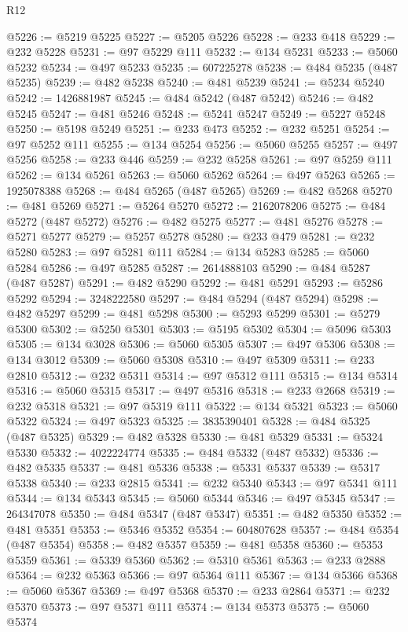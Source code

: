 \begin{lexlean}{R12}
\begin{coremodule}
{{{{{{{{{{{{{{{{{{{{{{{{{{{{{{{{{{{{{{{{{{{{{{{{{{{{{{{{{{{{{{{{{{{{{{{{{{{{{{{{{{@5226 := @5219 @5225
@5227 := @5205 @5226
@5228 := @233 @418
@5229 := @232 @5228
@5231 := @97 @5229 @111
@5232 := @134 @5231
@5233 := @5060 @5232
@5234 := @497 @5233
@5235 := 607225278
@5238 := @484 @5235 (@487 @5235)
@5239 := @482 @5238
@5240 := @481 @5239
@5241 := @5234 @5240
@5242 := 1426881987
@5245 := @484 @5242 (@487 @5242)
@5246 := @482 @5245
@5247 := @481 @5246
@5248 := @5241 @5247
@5249 := @5227 @5248
@5250 := @5198 @5249
@5251 := @233 @473
@5252 := @232 @5251
@5254 := @97 @5252 @111
@5255 := @134 @5254
@5256 := @5060 @5255
@5257 := @497 @5256
@5258 := @233 @446
@5259 := @232 @5258
@5261 := @97 @5259 @111
@5262 := @134 @5261
@5263 := @5060 @5262
@5264 := @497 @5263
@5265 := 1925078388
@5268 := @484 @5265 (@487 @5265)
@5269 := @482 @5268
@5270 := @481 @5269
@5271 := @5264 @5270
@5272 := 2162078206
@5275 := @484 @5272 (@487 @5272)
@5276 := @482 @5275
@5277 := @481 @5276
@5278 := @5271 @5277
@5279 := @5257 @5278
@5280 := @233 @479
@5281 := @232 @5280
@5283 := @97 @5281 @111
@5284 := @134 @5283
@5285 := @5060 @5284
@5286 := @497 @5285
@5287 := 2614888103
@5290 := @484 @5287 (@487 @5287)
@5291 := @482 @5290
@5292 := @481 @5291
@5293 := @5286 @5292
@5294 := 3248222580
@5297 := @484 @5294 (@487 @5294)
@5298 := @482 @5297
@5299 := @481 @5298
@5300 := @5293 @5299
@5301 := @5279 @5300
@5302 := @5250 @5301
@5303 := @5195 @5302
@5304 := @5096 @5303
@5305 := @134 @3028
@5306 := @5060 @5305
@5307 := @497 @5306
@5308 := @134 @3012
@5309 := @5060 @5308
@5310 := @497 @5309
@5311 := @233 @2810
@5312 := @232 @5311
@5314 := @97 @5312 @111
@5315 := @134 @5314
@5316 := @5060 @5315
@5317 := @497 @5316
@5318 := @233 @2668
@5319 := @232 @5318
@5321 := @97 @5319 @111
@5322 := @134 @5321
@5323 := @5060 @5322
@5324 := @497 @5323
@5325 := 3835390401
@5328 := @484 @5325 (@487 @5325)
@5329 := @482 @5328
@5330 := @481 @5329
@5331 := @5324 @5330
@5332 := 4022224774
@5335 := @484 @5332 (@487 @5332)
@5336 := @482 @5335
@5337 := @481 @5336
@5338 := @5331 @5337
@5339 := @5317 @5338
@5340 := @233 @2815
@5341 := @232 @5340
@5343 := @97 @5341 @111
@5344 := @134 @5343
@5345 := @5060 @5344
@5346 := @497 @5345
@5347 := 264347078
@5350 := @484 @5347 (@487 @5347)
@5351 := @482 @5350
@5352 := @481 @5351
@5353 := @5346 @5352
@5354 := 604807628
@5357 := @484 @5354 (@487 @5354)
@5358 := @482 @5357
@5359 := @481 @5358
@5360 := @5353 @5359
@5361 := @5339 @5360
@5362 := @5310 @5361
@5363 := @233 @2888
@5364 := @232 @5363
@5366 := @97 @5364 @111
@5367 := @134 @5366
@5368 := @5060 @5367
@5369 := @497 @5368
@5370 := @233 @2864
@5371 := @232 @5370
@5373 := @97 @5371 @111
@5374 := @134 @5373
@5375 := @5060 @5374
}}}}}}}}}}}}}}}}}}}}}}}}}}}}}}}}}}}}}}}}}}}}}}}}}}}}}}}}}}}}}}}}}}}}}}}}}}}}}}}}}}
\end{coremodule}
\end{lexlean}
